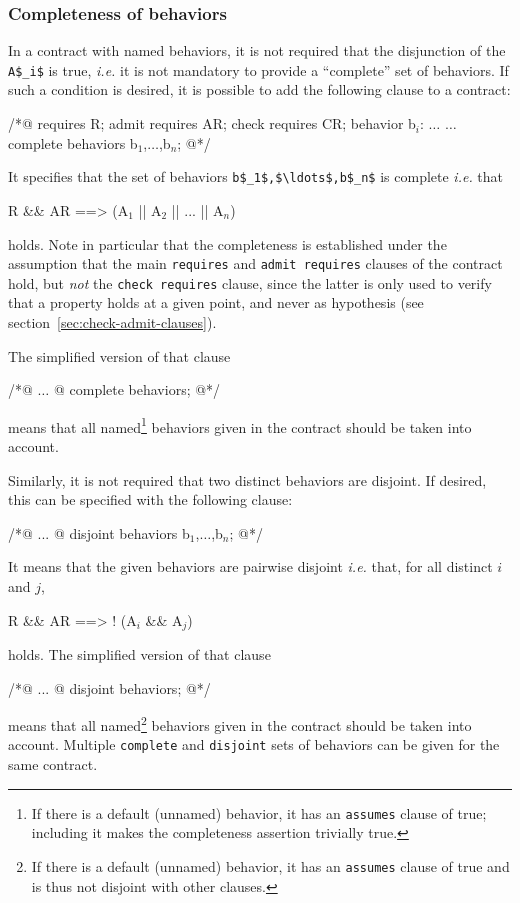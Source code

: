 \subsubsection{Completeness of behaviors}
\label{sec:compl-behav}
In a contract with named behaviors, it is not required that
the disjunction of the \lstinline|A$_i$| is true, \emph{i.e.} it is not
mandatory to provide a ``complete'' set of behaviors.
If such a condition is desired, it is possible to add the following clause
to a contract:
\begin{listing-nonumber}
/*@ requires R;
    admit requires AR;
    check requires CR;
    behavior b$_i$: $\dots$
    $\dots$
    complete behaviors b$_1$,$\dots$,b$_n$;
  @*/
\end{listing-nonumber}
It specifies that the set of behaviors \lstinline|b$_1$,$\ldots$,b$_n$|
is complete \emph{i.e.} that
\begin{listing-nonumber}
R && AR ==> (A$_1$ || A$_2$ || ... || A$_n$)
\end{listing-nonumber}
holds. Note in particular that the completeness is established under the assumption
that the main \lstinline|requires| and \lstinline|admit requires| clauses of the contract
hold, but \emph{not} the \lstinline|check requires| clause, since the latter is
only used to verify that a property holds at a given point, and never as hypothesis
(see section~\ref{sec:check-admit-clauses}).

The simplified version of that clause
\begin{listing-nonumber}
/*@ $\dots$
  @ complete behaviors;
  @*/
\end{listing-nonumber}
means that all named\footnote{If there is a default (unnamed) behavior, it has an
	\lstinline|assumes| clause of true; including it makes the
	completeness assertion trivially true.} behaviors given in the contract should be taken into account.

Similarly, it is not required that two distinct behaviors are disjoint.
If desired, this can be specified with the following clause:
\begin{listing-nonumber}
/*@ ...
  @ disjoint behaviors b$_1$,$\dots$,b$_n$;
  @*/
\end{listing-nonumber}
It means that the given behaviors are pairwise disjoint \emph{i.e.}
that, for all distinct $i$ and $j$,
\begin{listing-nonumber}
R && AR ==> ! (A$_i$ && A$_j$)
\end{listing-nonumber}
holds.
The simplified version of that clause
\begin{listing-nonumber}
/*@ ...
  @ disjoint behaviors;
  @*/
\end{listing-nonumber}
means that all named\footnote{If there is a default (unnamed) behavior, it has an
\lstinline|assumes| clause of true and is thus not disjoint with other clauses.} behaviors given in the contract should be taken into account.
Multiple \lstinline|complete| and \lstinline|disjoint| sets of behaviors can
be given for the same contract.


